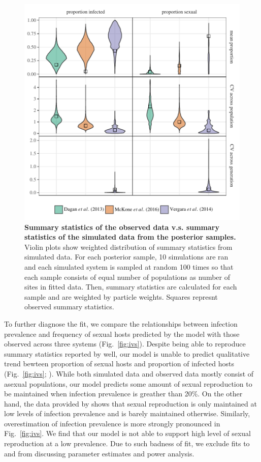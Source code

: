 \documentclass{article}\usepackage[]{graphicx}\usepackage[]{color}
\newcommand{\fref}[1]{Fig.~\ref{fig:#1}}
\begin{document}
\begin{figure}[!ht]
\includegraphics[width=\textwidth]{../fig/smc_summary.pdf}
\caption{{\bf Summary statistics of the observed data v.s. summary statistics of the simulated data from the posterior samples.}
Violin plots show weighted distribution of summary statistics from simulated data. For each posterior sample, 10 simulations are ran and each simulated system is sampled at random 100 times so that each sample consists of equal number of populations as number of sites in fitted data. Then, summary statistics are calculated for each sample and are weighted by particle weights. Squares represnt observed summary statistics.
}
\label{fig:smcsumm}
\end{figure}

To further diagnose the fit, we compare the relationships between infection prevalence and frequency of sexual hosts predicted by the model with those observed across three systems (\fref{ivs}).
Despite being able to reproduce summary statistics reported by \cite{dagan2013clonal} well, 
our model is unable to predict qualitative trend bewteen proportion of sexual hosts and proportion of infected hosts (\fref{ivs}; \cite{dagan2013clonal}).
While both simulated data and observed data mostly consist of asexual populations,
our model predicts some amount of sexual reproduction to be maintained when infection prevalence is greather than 20\%. 
On the other hand, the data provided by \cite{dagan2013clonal} shows that sexual reproduction is only maintained at low levels of infection prevalence and is barely maintained otherwise.
Similarly, overestimation of infection prevalence is more strongly pronounced in \fref{ivs}.
We find that our model is not able to support high level of sexual reproduction at a low prevalence.
Due to such badness of fit, we exclude fits to \cite{dagan2013clonal} and \cite{mckone2016fine} from discussing parameter estimates and power analysis.
\end{document}
